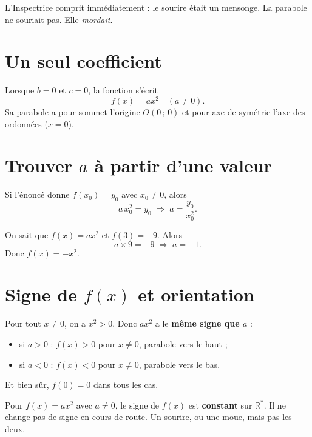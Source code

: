 \documentclass[11pt,a4paper]{article}
\begin{document}
L'Inspectrice comprit immédiatement : le sourire était un mensonge. La parabole ne souriait pas. Elle \emph{mordait}.

\section{Un seul coefficient}

\begin{indice}
Lorsque $b = 0$ et $c = 0$, la fonction s'écrit
\[
  f(x) = ax^2 \quad (a \neq 0).
\]
Sa parabole a pour sommet l'origine $O(0\,;\,0)$ et pour axe de symétrie l'axe des ordonnées ($x = 0$).
\end{indice}

\section{Trouver \texorpdfstring{$a$}{a} à partir d'une valeur}

\begin{methode}
Si l'énoncé donne $f(x_0) = y_0$ avec $x_0 \neq 0$, alors
\[
  a\,x_0^2 = y_0 \;\Longrightarrow\; a = \frac{y_0}{x_0^2}.
\]
\end{methode}

\begin{rapport}
On sait que $f(x) = ax^2$ et $f(3) = -9$. Alors
\[
  a \times 9 = -9 \;\Longrightarrow\; a = -1.
\]
Donc $f(x) = -x^2$.
\end{rapport}

\section{Signe de \texorpdfstring{$f(x)$}{f(x)} et orientation}

\begin{indice}[Signe de $ax^2$]
Pour tout $x \neq 0$, on a $x^2 > 0$. Donc $ax^2$ a le \textbf{même signe que $a$} :
\begin{itemize}[leftmargin=*]
  \item si $a > 0$ : $f(x) > 0$ pour $x \neq 0$, parabole vers le haut ;
  \item si $a < 0$ : $f(x) < 0$ pour $x \neq 0$, parabole vers le bas.
\end{itemize}
Et bien sûr, $f(0) = 0$ dans tous les cas.
\end{indice}

\begin{alerte}
Pour $f(x) = ax^2$ avec $a \neq 0$, le signe de $f(x)$ est \textbf{constant} sur $\mathbb{R}^*$. Il ne change pas de signe en cours de route. Un sourire, ou une moue, mais pas les deux.
\end{alerte}
\end{document}

